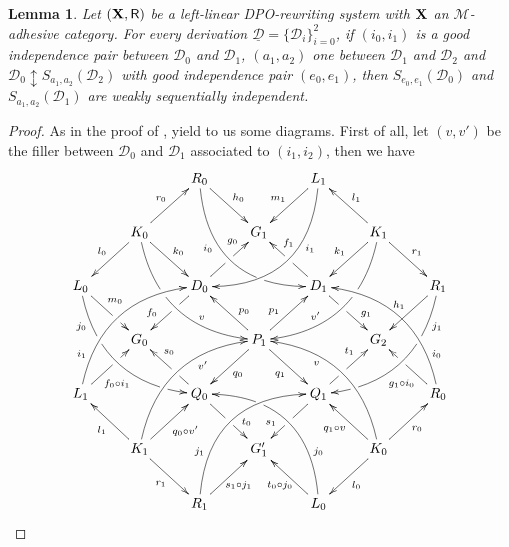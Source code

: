 \documentclass[a4paper]{article}
\def\R{\mathsf{R}}
\def\X{\textbf {\textup{X}}}
\newcommand{\dder}[1]{\mathscr{#1}}
\newcommand{\der}[1]{\underline{\dder{#1}}}
\newtheorem{lemma}[theorem]{Lemma}
\theoremstyle{definition}
\begin{document}
 

\begin{lemma}\label{lem:iig2}Let $(\X,\R)$ be a left-linear DPO-rewriting system with $\X$ an $\mathcal{M}$-adhesive category. For every derivation $\der{D}=\{\dder{D}_i\}_{i=0}^2$, if $(i_0,i_1)$ is a good independence pair between $\dder{D}_0$ and $\dder{D}_1$, $(a_1,a_2)$ one between $\dder{D}_1$ and $\dder{D}_2$ and $\dder{D}_0\updownarrow S_{a_1,a_2}(\dder{D}_2)$ with good independence pair $(e_0,e_1)$, then $S_{e_0,e_1}(\dder{D}_0)$ and $S_{a_1,a_2}(\dder{D}_1)$ are weakly sequentially independent.
\end{lemma}
\begin{proof} As in the proof of ,  yield to us some diagrams.  First of all, let $(v,v')$ be the filler between $\dder{D}_0$ and $\dder{D}_1$ associated to $(i_1, i_2)$, then we have
	\[\xymatrix{&&R_0 \ar@/_1cm/[ddrr]_(.35){i_0}|(.7)\hole \ar[dr]^{h_0}&& L_1\ar@/^1cm/[ddll]^(.35){i_1}  \ar[dl]_{m_1}\\&K_0\ar[dr]^{k_0}\ar[dl]_{l_0} \ar@/_.8cm/[ddrr]|(.36)\hole^(.65){v}\ar[ur]^{r_0}&& G_1 && K_1 \ar@/^.8cm/[ddll]|(.36)\hole_(.65){v'}\ar[dl]_{k_1}\ar[lu]_{l_1} \ar[dr]^{r_1}\\L_0 \ar@/_.8cm/[ddrr]_(.2){j_0}|(.31)\hole|(.81)\hole \ar[dr]^(.4){m_0}|(.61)\hole && D_0 \ar[dl]|(.4)\hole_(.65){f_0}\ar[ur]|(.5)\hole^(.7){g_0}&&D_1 \ar[dr]|(.4)\hole^(.65){g_1} \ar[ul]|(.5)\hole_(.65){f_1}&&R_1\ar@/^.8cm/[ddll]^(.2){j_1}|(.31)\hole|(.81)\hole\ar[dl]_{h_1}\\&G_0 &&P_1\ar[dr]_{q_1} \ar[dl]^{q_0}\ar[ur]^(.4){p_1}\ar[ul]_(.4){p_0}&&G_2\\L_1 \ar@/^.8cm/[uurr]^(.2){i_1} \ar[ur]_(.35){f_0\circ i_1}|(.61)\hole&&Q_0 \ar[ul]|(.4)\hole_(.65){s_0}\ar[dr]|(.5)\hole^(.65){t_0} &&Q_1\ar[ur]|(.4)\hole^(.65){t_1} \ar[dl]|(.5)\hole_(.65){s_1} && R_0  \ar[ul]^(.35){g_1\circ i_0}|(.61)\hole\ar@/_.8cm/[uull]_(.2){i_0}\\&K_1 \ar[ur]_{q_0\circ v'} \ar[dr]_{r_1} \ar[ul]^{l_1}\ar@/^.8cm/[uurr]_(.65){v'}&&G'_1&& K_0 \ar[ur]_{r_0} \ar[ul]^{q_1\circ v} \ar[dl]^{l_0} \ar@/_.8cm/[uull]^(.65){v}\\&& R_1 \ar[ur]_{\hspace{-5pt}s_1\circ j_1}\ar@/^1cm/[uurr]^(.25){j_1}&& L_0 \ar[ul]^{t_0\circ j_0\hspace{-5pt}} \ar@/_1cm/[uull]_(.25){j_0} |(.69)\hole }\]
	

\end{proof}
\end{document}
